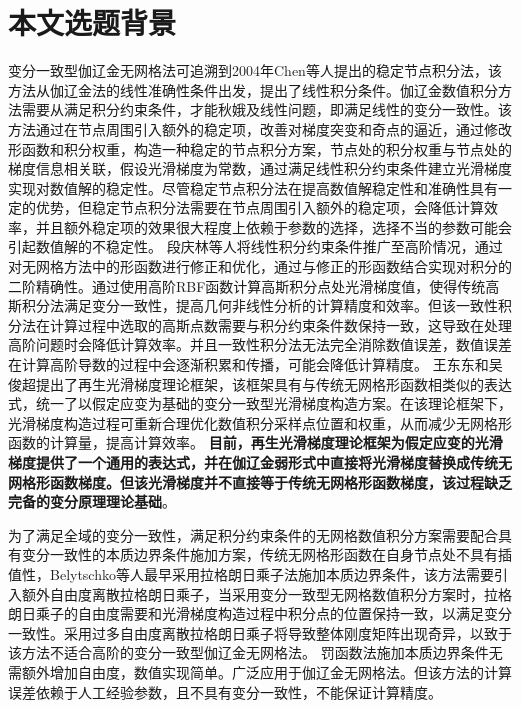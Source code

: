 \section{本文选题背景}
变分一致型伽辽金无网格法可追溯到2004年Chen等人\textsuperscript{\cite{chen2001}}提出的稳定节点积分法，该方法从伽辽金法的线性准确性条件出发，提出了线性积分条件。伽辽金数值积分方法需要从满足积分约束条件，才能秋娥及线性问题，即满足线性的变分一致性。该方法通过在节点周围引入额外的稳定项，改善对梯度突变和奇点的逼近，通过修改形函数和积分权重，构造一种稳定的节点积分方案，节点处的积分权重与节点处的梯度信息相关联，假设光滑梯度为常数，通过满足线性积分约束条件建立光滑梯度实现对数值解的稳定性。尽管稳定节点积分法在提高数值解稳定性和准确性具有一定的优势，但稳定节点积分法需要在节点周围引入额外的稳定项，会降低计算效率，并且额外稳定项的效果很大程度上依赖于参数的选择，选择不当的参数可能会引起数值解的不稳定性。
段庆林等人\textsuperscript{\cite{陈嵩涛2020几何非线性分析的高效高阶无网格法,duan2012}}将线性积分约束条件推广至高阶情况，通过对无网格方法中的形函数进行修正和优化，通过与修正的形函数结合实现对积分的二阶精确性。通过使用高阶RBF函数计算高斯积分点处光滑梯度值，使得传统高斯积分法满足变分一致性，提高几何非线性分析的计算精度和效率。但该一致性积分法在计算过程中选取的高斯点数需要与积分约束条件数保持一致，这导致在处理高阶问题时会降低计算效率。并且一致性积分法无法完全消除数值误差，数值误差在计算高阶导数的过程中会逐渐积累和传播，可能会降低计算精度。
王东东和吴俊超提出了再生光滑梯度理论框架\textsuperscript{\cite{wang2019}}，该框架具有与传统无网格形函数相类似的表达式，统一了以假定应变为基础的变分一致型光滑梯度构造方案。在该理论框架下，光滑梯度构造过程可重新合理优化数值积分采样点位置和权重，从而减少无网格形函数的计算量，提高计算效率。
\textbf{目前，再生光滑梯度理论框架为假定应变的光滑梯度提供了一个通用的表达式，并在伽辽金弱形式中直接将光滑梯度替换成传统无网格形函数梯度。但该光滑梯度并不直接等于传统无网格形函数梯度，该过程缺乏完备的变分原理理论基础}。
\par
为了满足全域的变分一致性，满足积分约束条件的无网格数值积分方案需要配合具有变分一致性的本质边界条件施加方案，传统无网格形函数在自身节点处不具有插值性，Belytschko等人\textsuperscript{\cite{belytschko1994}}最早采用拉格朗日乘子法施加本质边界条件，该方法需要引入额外自由度离散拉格朗日乘子，当采用变分一致型无网格数值积分方案时，拉格朗日乘子的自由度需要和光滑梯度构造过程中积分点的位置保持一致，以满足变分一致性。采用过多自由度离散拉格朗日乘子将导致整体刚度矩阵出现奇异，以致于该方法不适合高阶的变分一致型伽辽金无网格法。
罚函数法\textsuperscript{\cite{zhu1998}}施加本质边界条件无需额外增加自由度，数值实现简单。广泛应用于伽辽金无网格法。但该方法的计算误差依赖于人工经验参数，且不具有变分一致性，不能保证计算精度。
